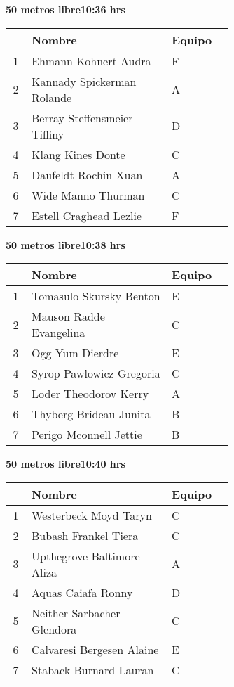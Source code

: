 \begin{minipage}{0.95\linewidth}
\begin{center}
\textbf{
50 metros libre\hspace{1cm}10:36 hrs}
\end{center}
\begin{tabular}{cp{0.63\linewidth}l}
\hline
& \textbf{Nombre} & \textbf{Equipo} \\ \hline
1 & Ehmann Kohnert Audra & F \\ 
2 & Kannady Spickerman Rolande & A \\ 
3 & Berray Steffensmeier Tiffiny & D \\ 
4 & Klang Kines Donte & C \\ 
5 & Daufeldt Rochin Xuan & A \\ 
6 & Wide Manno Thurman & C \\ 
7 & Estell Craghead Lezlie & F \\ 
\end{tabular}
\end{minipage}
\begin{minipage}{0.95\linewidth}
\begin{center}
\textbf{
50 metros libre\hspace{1cm}10:38 hrs}
\end{center}
\begin{tabular}{cp{0.63\linewidth}l}
\hline
& \textbf{Nombre} & \textbf{Equipo} \\ \hline
1 & Tomasulo Skursky Benton & E \\ 
2 & Mauson Radde Evangelina & C \\ 
3 & Ogg Yum Dierdre & E \\ 
4 & Syrop Pawlowicz Gregoria & C \\ 
5 & Loder Theodorov Kerry & A \\ 
6 & Thyberg Brideau Junita & B \\ 
7 & Perigo Mconnell Jettie & B \\ 
\end{tabular}
\end{minipage}
\begin{minipage}{0.95\linewidth}
\begin{center}
\textbf{
50 metros libre\hspace{1cm}10:40 hrs}
\end{center}
\begin{tabular}{cp{0.63\linewidth}l}
\hline
& \textbf{Nombre} & \textbf{Equipo} \\ \hline
1 & Westerbeck Moyd Taryn & C \\ 
2 & Bubash Frankel Tiera & C \\ 
3 & Upthegrove Baltimore Aliza & A \\ 
4 & Aquas Caiafa Ronny & D \\ 
5 & Neither Sarbacher Glendora & C \\ 
6 & Calvaresi Bergesen Alaine & E \\ 
7 & Staback Burnard Lauran & C \\ 
\end{tabular}
\end{minipage}
